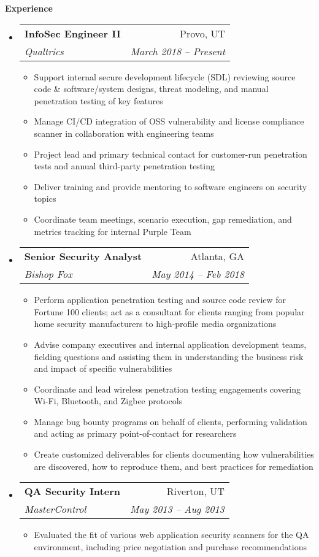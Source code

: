 \documentclass[letterpaper,11pt]{article}
\makeatletter
\newcommand{\resitem}[1]{\item #1 \vspace{-2pt}}
\newcommand{\resheading}[1]{{\large \colorbox{mygrey}{\begin{minipage}{\textwidth}{\textbf{#1 \vphantom{p\^{E}}}}\end{minipage}}}}
\newcommand{\ressubheading}[4]{
\begin{tabular*}{6.5in}{l@{\extracolsep{\fill}}r}
		\textbf{#1} & #2 \\
		\textit{#3} & \textit{#4} \\
\end{tabular*}\vspace{-6pt}}
\makeatother
\begin{document}
\resheading{Experience}
	\begin{itemize}
		\item
			\ressubheading{InfoSec Engineer II}{Provo, UT}{Qualtrics}{March 2018 -- Present}
			{ \footnotesize
				\begin{itemize}
					\resitem{Support internal secure development lifecycle (SDL) reviewing source code & software/system designs, threat modeling, and manual penetration testing of key features}
					\resitem{Manage CI/CD integration of OSS vulnerability and license compliance scanner in collaboration with engineering teams}
					\resitem{Project lead and primary technical contact for customer-run penetration tests and annual third-party penetration testing}
					\resitem{Deliver training and provide mentoring to software engineers on security topics}
					\resitem{Coordinate team meetings, scenario execution, gap remediation, and metrics tracking for internal Purple Team}
				\end{itemize}
			}
		\item
			\ressubheading{Senior Security Analyst}{Atlanta, GA}{Bishop Fox}{May 2014 -- Feb 2018}
			{ \footnotesize
			\begin{itemize}
				\resitem{Perform application penetration testing and source code review for Fortune 100 clients; act as a consultant for clients ranging from popular home security manufacturers to high-profile media organizations}
				\resitem{Advise company executives and internal application development teams, fielding questions and assisting them in understanding the business risk and impact of specific vulnerabilities}
				\resitem{Coordinate and lead wireless penetration testing engagements covering Wi-Fi, Bluetooth, and Zigbee protocols}
				\resitem{Manage bug bounty programs on behalf of clients, performing validation and acting as primary point-of-contact for researchers}
				\resitem{Create customized deliverables for clients documenting how vulnerabilities are discovered, how to reproduce them, and best practices for remediation}
			\end{itemize}
			}
		\item 
			\ressubheading{QA Security Intern}{Riverton, UT}{MasterControl}{May 2013 -- Aug 2013}
				{ \footnotesize
				\begin{itemize}
					\resitem{Evaluated the fit of various web application security scanners for the QA environment, including price negotiation and purchase recommendations}

\end{itemize}}
\end{itemize}
\end{document}

